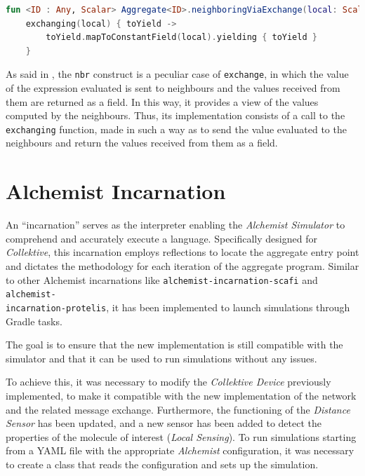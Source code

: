 \begin{lstlisting}[language=kt,label={lst:neighboringViaExchange},caption={The implementation of the \texttt{neighboringViaExchange} function.}]
fun <ID : Any, Scalar> Aggregate<ID>.neighboringViaExchange(local: Scalar): Field<ID, Scalar> =
    exchanging(local) { toYield ->
        toYield.mapToConstantField(local).yielding { toYield }
    }
\end{lstlisting}

As said in , the \texttt{nbr} construct is a peculiar case of \texttt{exchange}, in which
the value of the expression evaluated is sent to neighbours and the values received from them are returned as a field.
In this way, it provides a view of the values computed by the neighbours.
Thus, its implementation consists of a call to the \texttt{exchanging} function, made in such a way as to send the value
evaluated to the neighbours and return the values received from them as a field.

\section{Alchemist Incarnation}
\label{sec:incarnation}
An ``incarnation'' serves as the interpreter enabling the \emph{Alchemist Simulator} to comprehend and accurately execute a language.
Specifically designed for \emph{Collektive}, this incarnation employs reflections to locate the aggregate entry point and
dictates the methodology for each iteration of the aggregate program.
Similar to other Alchemist incarnations like \texttt{alchemist-incarnation-scafi} and \texttt{alchemist-\\incarnation-protelis},
it has been implemented to launch simulations through Gradle tasks.

The goal is to ensure that the new implementation is still compatible with the simulator and that it can be used to run simulations without any issues.

To achieve this, it was necessary to modify the \emph{Collektive Device} previously implemented, to make it compatible
with the new implementation of the network and the related message exchange.
Furthermore, the functioning of the \emph{Distance Sensor} has been updated, and a new sensor has been added to detect
the properties of the molecule of interest (\emph{Local Sensing}).
To run simulations starting from a YAML file with the appropriate \emph{Alchemist} configuration, it was necessary to
create a class that reads the configuration and sets up the simulation.

